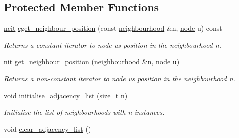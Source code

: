 \subsection*{Protected Member Functions}
\begin{DoxyCompactItemize}
\item 
\hyperlink{namespacelgraph_1_1utils_a7207b078932845778282f5e2e373575b}{ncit} \hyperlink{classlgraph_1_1utils_1_1xxgraph_af72476b0919eacd6e9b044f7c5528c1e}{cget\+\_\+neighbour\+\_\+position} (const \hyperlink{namespacelgraph_1_1utils_a0f2ef47028a466d26841709e705390ac}{neighbourhood} \&n, \hyperlink{namespacelgraph_1_1utils_ab9c6b34241f0b68372c55f34c460e863}{node} u) const 
\begin{DoxyCompactList}\small\item\em Returns a constant iterator to node {\itshape u\textquotesingle{}s} position in the neighbourhood {\itshape n}. \end{DoxyCompactList}\item 
\hyperlink{namespacelgraph_1_1utils_af5daf6fe356a9014746bdb507787ae01}{nit} \hyperlink{classlgraph_1_1utils_1_1xxgraph_ab2ac2eb4cdc6c369cde7c71a1c3b8858}{get\+\_\+neighbour\+\_\+position} (\hyperlink{namespacelgraph_1_1utils_a0f2ef47028a466d26841709e705390ac}{neighbourhood} \&n, \hyperlink{namespacelgraph_1_1utils_ab9c6b34241f0b68372c55f34c460e863}{node} u)
\begin{DoxyCompactList}\small\item\em Returns a non-\/constant iterator to node {\itshape u\textquotesingle{}s} position in the neighbourhood {\itshape n}. \end{DoxyCompactList}\item 
void \hyperlink{classlgraph_1_1utils_1_1xxgraph_a2201aaff5e9ffa29a9b3abfde705dd46}{initialise\+\_\+adjacency\+\_\+list} (size\+\_\+t n)\hypertarget{classlgraph_1_1utils_1_1xxgraph_a2201aaff5e9ffa29a9b3abfde705dd46}{}\label{classlgraph_1_1utils_1_1xxgraph_a2201aaff5e9ffa29a9b3abfde705dd46}

\begin{DoxyCompactList}\small\item\em Initialise the list of neighbourhoods with {\itshape n} instances. \end{DoxyCompactList}\item 
void \hyperlink{classlgraph_1_1utils_1_1xxgraph_a6523402d0ec66918b95de23d2bee38fc}{clear\+\_\+adjacency\+\_\+list} ()\hypertarget{classlgraph_1_1utils_1_1xxgraph_a6523402d0ec66918b95de23d2bee38fc}{}\label{classlgraph_1_1utils_1_1xxgraph_a6523402d0ec66918b95de23d2bee38fc}


\end{DoxyCompactItemize}
